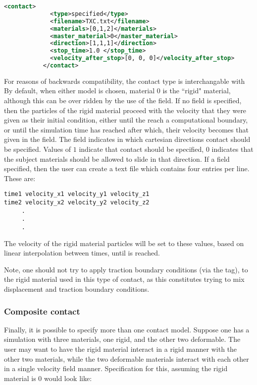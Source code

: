 \begin{lstlisting}[language=XML]
           <contact>
             <type>specified</type>
             <filename>TXC.txt</filename>
             <materials>[0,1,2]</materials>
             <master_material>0</master_material>
             <direction>[1,1,1]</direction>
             <stop_time>1.0 </stop_time>
             <velocity_after_stop>[0, 0, 0]</velocity_after_stop>
           </contact>
\end{lstlisting}
For reasons of backwards compatibility, the
 contact type is interchangable with
  By default, when either model is
chosen, material 0 is the ``rigid" material, although this can be
over ridden by the use of the
 field.  If no
 field is specified, then the particles of the
rigid material proceed with the velocity that they were given as their
initial condition, either until the reach a computational boundary, or
until the simulation time has reached  after
which, their velocity becomes that given in the
 field.  The 
field indicates in which cartesian directions contact should be specified.
Values of $1$ indicate that contact should be specified, $0$ indicates that
the subject materials should be allowed to slide in that direction.  If
a  field  specified, then the user can
create a text file which contains four entries per line.  These are:
\begin{lstlisting}[backgroundcolor=\color{background}]
time1 velocity_x1 velocity_y1 velocity_z1
time2 velocity_x2 velocity_y2 velocity_z2
     .
     .
     .
\end{lstlisting}
The velocity of the rigid material particles will be set to these values,
based on linear interpolation between times, until 
is reached.  
\begin{WarningBox}
Note, one should not try to apply traction boundary conditions
(via the   tag), to the rigid material used in this type of 
contact, as this constitutes trying to mix displacement and traction boundary
conditions. 
\end{WarningBox}

\subsubsection{Composite contact}
Finally, it is possible to specify more than one contact model.  Suppose
one has a simulation with three materials, one rigid, and the other two
deformable.  The user may want to have the rigid material interact in a
rigid manner with the other two materials, while the two deformable materials
interact with each other in a single velocity field manner.  Specification
for this, assuming the rigid material is $0$ would look like:

